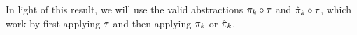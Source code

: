 In light of this result, we will use the valid abstractions $\pi_k\circ\tau$ and $\hat{\pi}_k\circ\tau$,
which work by first applying $\tau$ and then applying $\pi_k$ or $\hat{\pi}_k$.

%
%
%
%
%
%
%
%
%
%
